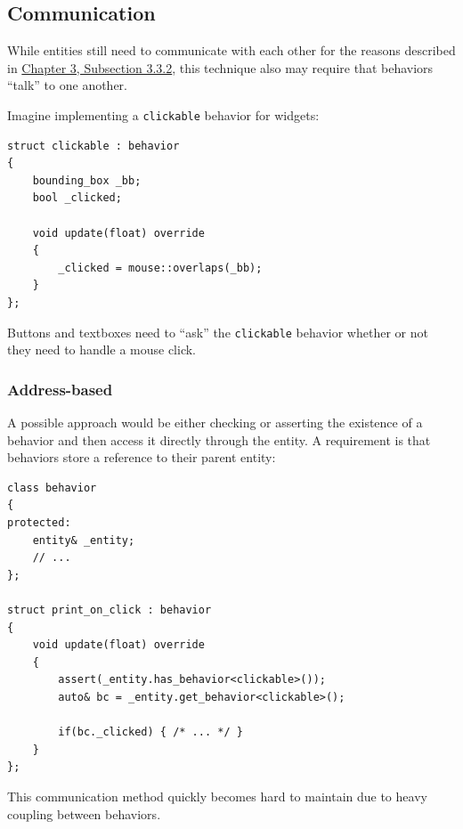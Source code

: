 \documentclass[oneside, 12pt, a4paper, openany]{book}
\begin{document}
\subsection{Communication}\label{communication}

While entities still need to communicate with each other for the reasons
described in \protect\hyperlink{chapter_oop_communication}{Chapter 3,
Subsection 3.3.2}, this technique also may require that behaviors
``talk'' to one another.

Imagine implementing a
\texttt{clickable}
behavior for widgets:

\begin{verbatim}
struct clickable : behavior
{
    bounding_box _bb;
    bool _clicked;

    void update(float) override
    {
        _clicked = mouse::overlaps(_bb);
    }
};
\end{verbatim}

Buttons and textboxes need to ``ask'' the
\texttt{clickable}
behavior whether or not they need to handle a mouse click.

\subsubsection{Address-based}\label{address-based-1}

A possible approach would be either checking or asserting the existence
of a behavior and then access it directly through the entity. A
requirement is that behaviors store a reference to their parent entity:

\begin{verbatim}
class behavior
{
protected:
    entity& _entity;
    // ...
};

struct print_on_click : behavior
{
    void update(float) override
    {
        assert(_entity.has_behavior<clickable>());
        auto& bc = _entity.get_behavior<clickable>();

        if(bc._clicked) { /* ... */ }
    }
};
\end{verbatim}

This communication method quickly becomes hard to maintain due to heavy
coupling between behaviors.
\end{document}
